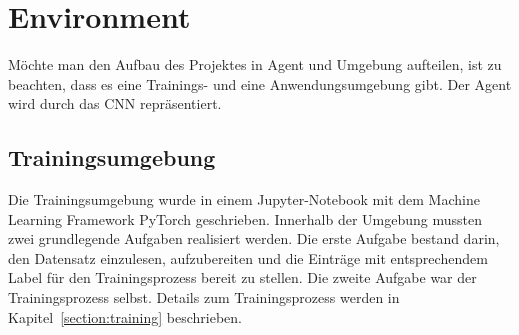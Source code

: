 \documentclass[sigconf]{acmart}
\begin{document}
\section{Environment}
Möchte man den Aufbau des Projektes in Agent und Umgebung aufteilen, ist zu beachten, dass es eine Trainings- und eine Anwendungsumgebung gibt. Der Agent wird durch das CNN repräsentiert. 

\subsection{Trainingsumgebung}
\label{section:Umgebung}
Die Trainingsumgebung wurde in einem Jupyter-Notebook mit dem Machine Learning Framework PyTorch geschrieben. Innerhalb der Umgebung mussten zwei grundlegende Aufgaben realisiert werden. 
Die erste Aufgabe bestand darin, den Datensatz einzulesen, aufzubereiten und die Einträge mit entsprechendem Label für den Trainingsprozess bereit zu stellen. Die zweite Aufgabe war der Trainingsprozess selbst. Details zum Trainingsprozess werden in Kapitel~\ref{section:training} beschrieben. 
\end{document}

